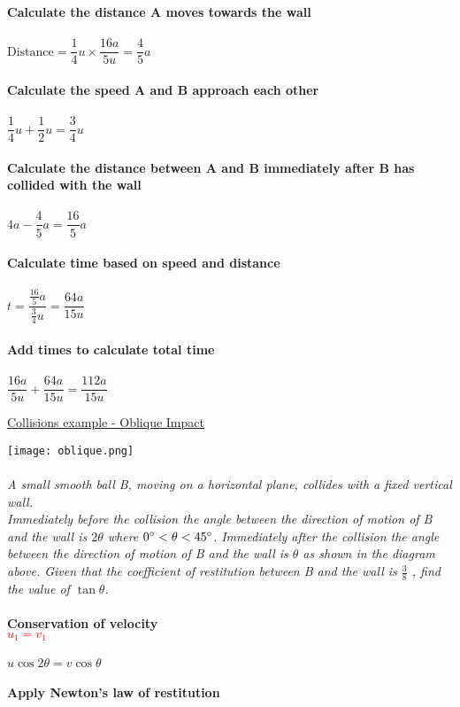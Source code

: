 \documentclass{article}[18pt]
\begin{document}
\textbf{Calculate the distance A moves towards the wall}\\
\\
$\text{Distance}=\dfrac{1}{4}u\times\dfrac{16a}{5u}=\dfrac{4}{5}a$\\
\\
\textbf{Calculate the speed A and B approach each other}\\
\\
$\dfrac{1}{4}u+\dfrac{1}{2}u=\dfrac{3}{4}u$\\
\\
\textbf{Calculate the distance between A and B immediately after B has collided with the wall}\\
\\
$4a-\dfrac{4}{5}a=\dfrac{16}{5}a$\\
\\
\textbf{Calculate time based on speed and distance}\\
\\
$t=\dfrac{\frac{16}{5}a}{\frac{3}{4}u}=\dfrac{64a}{15u}$\\
\\
\textbf{Add times to calculate total time}\\
\\
$\dfrac{16a}{5u}+\dfrac{64a}{15u}=\dfrac{112a}{15u}$
\newpage
\begin{center}
\underline{\huge Collisions example - Oblique Impact}
\end{center}
\texttt{[image: oblique.png]}\\
\\
\textit{A small smooth ball B, moving on a horizontal plane, collides with a fixed vertical wall.\\
Immediately before the collision the angle between the direction of motion of B and the wall is $2\theta$ where $0\degree < \theta < 45\degree$. Immediately after the collision the angle between the direction of motion
of B and the wall is $\theta$ as shown in the diagram above. Given that the coefficient of restitution
between B and the wall is $\frac{3}{8}$ , find the value of $\tan\theta$.}\\
\\
\textbf{Conservation of velocity}\\
\textcolor{red}{$u_1=v_1$}\\
\\
$u\cos2\theta=v\cos\theta$\\
\\
\textbf{Apply Newton's law of restitution}\\
\end{document}
